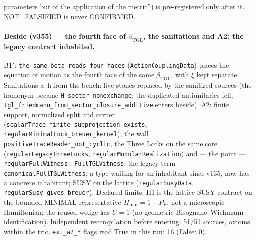 \documentclass[11pt]{article}
\newcommand{\bTGL}{\beta_{\mathrm{TGL}}}\newcommand{\Msun}{M_{\odot}}\newcommand{\TGL}{\mathrm{TGL}}
\theoremstyle{definition}\newtheorem{deriv}{Derivation}
\begin{document}
parameters but of the application of the metric'') is pre-registered only after it. NOT\_FALSIFIED is never CONFIRMED.

\paragraph*{Beside (v355) --- the fourth face of $\bTGL$, the sanitations and A2: the legacy contract inhabited.} B1$'$: \texttt{the\_same\_beta\_reads\_four\_faces} (\texttt{ActionCouplingData}) places the equation of motion as the fourth face of the same $\bTGL$, with $\xi$ kept separate. Sanitations a--h from the bench: five stones replaced by the sanitized sources (the homonym became \texttt{H\_sector\_nonexchange}; the duplicated antiunitaries fell; \texttt{tgl\_friedmann\_from\_sector\_closure\_additive} enters beside). A2: finite support, normalized split and corner (\texttt{scalarTrace\_finite\_subprojection\_exists}, \texttt{regularMinimalLock\_breuer\_kernel}), the wall \texttt{positiveTraceReader\_not\_cyclic}, the Three Locks on the same core (\texttt{regularLegacyThreeLocks}, \texttt{regularModularRealization}) and --- the point --- \texttt{regularFullWitness} : \texttt{FullTGLWitness}: the legacy term \texttt{canonicalFullTGLWitness}, a type waiting for an inhabitant since v135, now has a concrete inhabitant; SUSY on the lattice (\texttt{regularSusyData}, \texttt{regularSusy\_gives\_breuer}). Declared limits: H1 is the lattice SUSY contract on the bounded MINIMAL representative $H_{\min}=1-P_F$, not a microscopic Hamiltonian; the reused wedge has $U=1$ (no geometric Bisognano--Wichmann identification). Independent recompilation before entering: 51/51 sources, axioms within the trio. \texttt{ext\_a2\_*} flags read True in this run: 16 (False: 0).
\end{document}
